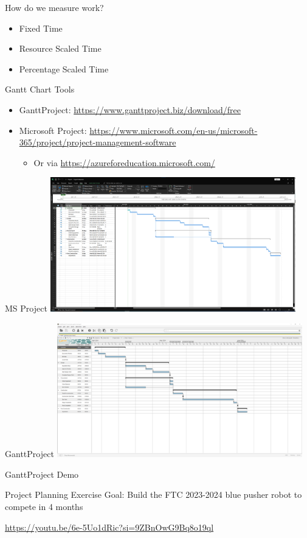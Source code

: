 \documentclass[aspectratio=169]{beamer}
\begin{document}
\begin{frame}{How do we measure work?}
    \begin{itemize}
        \item Fixed Time
        \item Resource Scaled Time
        \item Percentage Scaled Time
    \end{itemize}
\end{frame}
\begin{frame}{Gantt Chart Tools}
    \begin{itemize}
        \item GanttProject: \url{https://www.ganttproject.biz/download/free}
        \item Microsoft Project: \url{https://www.microsoft.com/en-us/microsoft-365/project/project-management-software}
        \begin{itemize}
            \item Or via \url{https://azureforeducation.microsoft.com/}
        \end{itemize}
    \end{itemize}
\end{frame}
\begin{frame}{MS Project}
    \centering
    \includegraphics[width=0.8\textwidth]{14_ms_project.png}
\end{frame}
\begin{frame}{GanttProject}
    \centering
    \includegraphics[width=0.8\textwidth]{14_ganttproject.png}
\end{frame}
\begin{frame}
    GanttProject Demo
\end{frame}
\begin{frame}{Project Planning Exercise}
    Goal: Build the FTC 2023-2024 blue pusher robot to compete in 4 months

    \url{https://youtu.be/6e-5Uo1dRic?si=9ZBnOwG9Bq8o19ql}
\end{frame}
\end{document}
